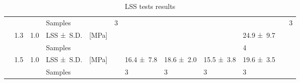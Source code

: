 \begin{table}[htb]
{\begin{tabular}{@{}lll L{1.6cm} l C{1.1cm} C{1.1cm} C{1.1cm} C{1.1cm} C{1.1cm} C{1.1cm} C{1.1cm} @{}}
		                   &          &           & Samples           &       & 3                 &                   &                   &                   &                   &                   & 3                 \\
		                   & 1.3      & 1.0       & LSS \mbox{± S.D.} & [MPa] &                   &                   &                   &                   & 24.9 \mbox{± 9.7} &                   &                   \\
		                   &          &           & Samples           &       &                   &                   &                   &                   & 4                 &                   &                   \\
		                   & 1.5      & 1.0       & LSS \mbox{± S.D.} & [MPa] &                   & 16.4 \mbox{± 7.8} & 18.6 \mbox{± 2.0} & 15.5 \mbox{± 3.8} & 19.6 \mbox{± 3.5} &                   &                   \\
		                   &          &           & Samples           &       &                   & 3                 & 3                 & 3                 & 3                 &                   &                   \\ \bottomrule
		\end{tabular}}
	\caption{LSS tests results}
	\label{tab:T2_table3}
\end{table}

